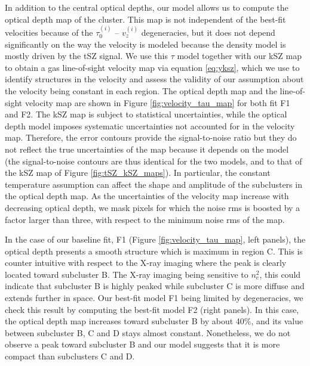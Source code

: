 \documentclass[twocolumn,traditabstract]{aa}
\begin{document}
In addition to the central optical depths, our model allows us to compute the optical depth map of the cluster. This map is not independent of the best-fit velocities because of the $\tau_0^{(i)}$ -- $v_z^{(i)}$ degeneracies, but it does not depend significantly on the way the velocity is modeled because the density model is mostly driven by the tSZ signal. We use this $\tau$ model together with our kSZ map to obtain a gas line-of-sight velocity map via equation \ref{eq:yksz}, which we use to identify structures in the velocity and assess the validity of our assumption about the velocity being constant in each region. The optical depth map and the line-of-sight velocity map are shown in Figure \ref{fig:velocity_tau_map} for both fit F1 and F2. The kSZ map is subject to statistical uncertainties, while the optical depth model imposes systematic uncertainties not accounted for in the velocity map. Therefore, the error contours provide the signal-to-noise ratio but they do not reflect the true uncertainties of the map because it depends on the model (the signal-to-noise contours are thus identical for the two models, and to that of the kSZ map of Figure \ref{fig:tSZ_kSZ_maps}). In particular, the constant temperature assumption can affect the shape and amplitude of the subclusters in the optical depth map. As the uncertainties of the velocity map increase with decreasing optical depth, we mask pixels for which the noise rms is boosted by a factor larger than three, with respect to the minimum noise rms of the map.

In the case of our baseline fit, F1 (Figure \ref{fig:velocity_tau_map}, left panels), the optical depth presents a smooth structure which is maximum in region C. This is counter intuitive with respect to the X-ray imaging where the peak is clearly located toward subcluster B. The X-ray imaging being sensitive to $n_e^2$, this could indicate that subcluster B is highly peaked while subcluster C is more diffuse and extends further in space. Our best-fit model F1 being limited by degeneracies, we check this result by computing the best-fit model F2 (right panels). In this case, the optical depth map increases toward subcluster B by about 40\%, and its value between subcluster B, C and D stays almost constant. Nonetheless, we do not observe a peak toward subcluster B and our model suggests that it is more compact than subclusters C and D.
\end{document}
